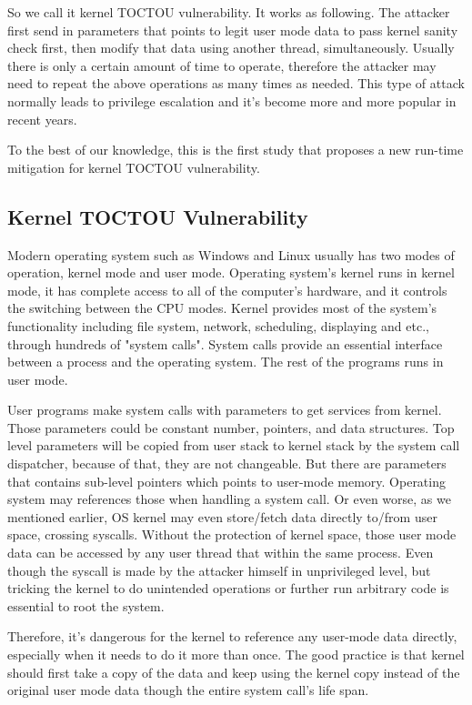 So we call it kernel TOCTOU vulnerability. It works as following. The attacker first send in parameters that points to legit user mode data to pass kernel sanity check first, then modify that data using another thread, simultaneously. Usually there is only a certain amount of time to operate, therefore the attacker may need to repeat the above operations as many times as needed. This type of attack normally leads to privilege escalation and it's become more and more popular in recent years.


To the best of our knowledge, this is the first study that proposes a new run-time mitigation for kernel TOCTOU vulnerability. 

\subsection{Kernel TOCTOU Vulnerability}

Modern operating system such as Windows and Linux usually has two modes of operation, kernel mode and user mode. Operating system's kernel runs in kernel mode, it has complete access to all of the computer's hardware, and it controls the switching between the CPU modes. Kernel provides most of the system's functionality including file system, network, scheduling, displaying and etc., through hundreds of "system calls". System calls provide an essential interface between a process and the operating system. The rest of the programs runs in user mode. 

User programs make system calls with parameters to get services from kernel. Those parameters could be constant number, pointers, and data structures. Top level parameters will be copied from user stack to kernel stack by the system call dispatcher, because of that, they are not changeable. But there are parameters that contains sub-level pointers which points to user-mode memory. Operating system may references those when handling a system call. Or even worse, as we mentioned earlier, OS kernel may even store/fetch data directly to/from user space, crossing syscalls. Without the protection of kernel space, those user mode data can be accessed by any user thread that within the same process. Even though the syscall is made by the attacker himself in unprivileged level, but tricking the kernel to do unintended operations or further run arbitrary code is essential to root the system.     

Therefore, it's dangerous for the kernel to reference any user-mode data directly, especially when it needs to do it more than once. The good practice is that kernel should first take a copy of the data and keep using the kernel copy instead of the original user mode data though the entire system call's life span.

